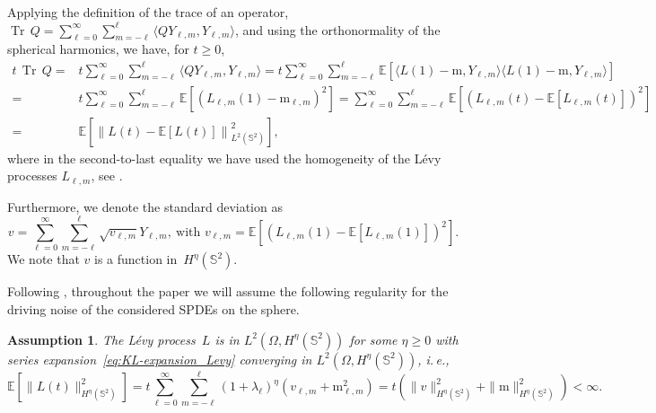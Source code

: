 \documentclass[11pt]{amsart}
\newtheorem{assumption}{Assumption}
\newcommand{\E}{{\mathbb E}}
\newcommand{\IS}{\mathbb{S}}
\newcommand{\tr}{{\operatorname{Tr}\, }}
\providecommand{\norm}[1]{\left\lVert#1\right\rVert}
\newcommand{\realSH}{{Y}}
\newcommand{\mean}{\mathrm{m}}
\newcommand{\varlm}{v_{\ell,m}}
\newcommand{\std}{{v}}
\begin{document}
Applying the definition of the trace of an operator, $\tr Q = \sum_{\ell=0}^{\infty}\sum_{m=-\ell}^{\ell} \langle Q Y_{\ell , m}, Y_{\ell , m} \rangle$, and using the orthonormality of the spherical harmonics, we have,
for $t\geq 0$,
\begin{equation*}
	\begin{aligned}
		t \, \tr Q = &t \sum_{\ell=0}^{\infty}\sum_{m=-\ell}^{\ell} \langle Q Y_{\ell , m}, Y_{\ell , m}\rangle = t \sum_{\ell=0}^{\infty}\sum_{m=-\ell}^{\ell} \E\left[\langle L(1) - \mean, Y_{\ell , m}\rangle \langle L(1)-\mean, Y_{\ell , m}\rangle \right]\\
        = & t \sum_{\ell=0}^\infty \sum_{m=-\ell}^\ell \E\left[(L_{\ell,m}(1) - \mean_{\ell, m})^2\right]
		= \sum_{\ell=0}^\infty \sum_{m=-\ell}^\ell  \E\left[(L_{\ell,m}(t) - \E\left[L_{\ell,m}(t)\right])^2\right]\\
        = & \E\left[\norm{L(t) - \E\left[L(t)\right]}_{L^2(\IS^2)}^2\right],
	\end{aligned}
\end{equation*}
where in the second-to-last equality we have used the homogeneity of the L\'evy processes $L_{\ell,m}$, see \cite[Section~4.8]{peszat2007}.

Furthermore, we denote the standard deviation as
\begin{equation}\label{Lvlm}
    \std = \sum_{\ell=0}^\infty \sum_{m=-\ell}^\ell \sqrt{\varlm} \realSH_{\ell,m},\ \text{with }\std_{\ell,m}=\E\left[(L_{\ell,m}(1) - \E\left[L_{\ell,m}(1)\right])^2\right].
\end{equation}
We note that $\std$ is a function in~$H^\eta(\IS^2)$.

Following \cite{papi2025}, throughout the paper we will assume the following regularity for the driving noise of the considered SPDEs on the sphere.

\begin{assumption}\label{ass:StrongLevyProcess}
	The L\'evy process~$L$ is in $L^2(\Omega, H^\eta(\IS^2))$ for some $\eta \geq 0$ with series expansion~\eqref{eq:KL-expansion_Levy} converging in $L^2(\Omega, H^\eta(\IS^2))$, i.\,e.,
	\begin{equation*}
		\E\left[\|L(t)\|_{H^\eta(\IS^2)}^2\right]
		= t \sum_{\ell=0}^\infty \sum_{m=-\ell}^\ell      (1+\lambda_\ell)^\eta (\varlm + \mean_{\ell, m}^2)
		= t (\|\std\|_{H^\eta(\IS^2)}^2 + \|\mean\|_{H^\eta(\IS^2)}^2)
		<\infty.
	\end{equation*}
\end{assumption}
\end{document}
